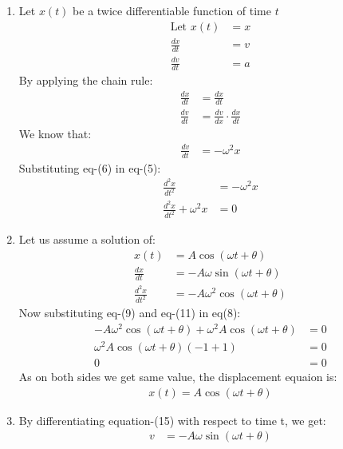 \documentclass[journal,12pt,twocolumn]{IEEEtran}
\theoremstyle{remark}
\begin{document}
\begin{enumerate}
\\
\item{}
Let $x(t)$ be a twice differentiable function of time $t$
\begin{align}
    \text{Let } x(t) &= x \\
    \frac{dx}{dt} &= v \\
    \frac{dv}{dt} &= a
\end{align}
By applying the chain rule:
\begin{align}
    \frac{dx}{dt} &= \frac{dx}{dt} \\
    \frac{dv}{dt} &= \frac{dv}{dx} \cdot \frac{dx}{dt}
\end{align}
We know that:
\begin{align}
    \frac{dv}{dt} &= -\omega^2x
\end{align}
Substituting eq-(6) in eq-(5):
\begin{align}
    \frac{d^2x}{dt^2} &= -\omega^2x\\
    \frac{d^2x}{dt^2}+\omega^2x&=0
\end{align}
\item{}
Let us assume a solution of:
\begin{align}
    x(t) &= A \cos(\omega t + \theta)\\
    \frac{dx}{dt} &= -A \omega \sin(\omega t + \theta)\\
    \frac{d^2x}{dt^2} &= -A \omega^2 \cos(\omega t + \theta)
  \end{align}
Now substituting eq-(9) and eq-(11) in eq(8):
\begin{align}
    -A \omega^2 \cos(\omega t + \theta) + \omega^2 A \cos(\omega t + \theta) &= 0\\
    \omega^2 A \cos(\omega t + \theta) \left(-1 + 1\right) &= 0\\
    0 &= 0
\end{align}
As on both sides we get same value, the displacement equaion is:
\begin{align}
    x(t)= A \cos(\omega t + \theta)
\end{align}
\item{}
By differentiating equation-(15) with respect to time t,
we get:
\begin{align}
v&=-A\omega{}\sin(\omega{t}+\theta{})  
\end{align}

\end{enumerate}
\end{document}
